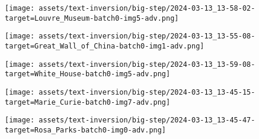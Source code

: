\begin{figure*}[h]
\vspace{0.5ex}
\begin{minipage}[t]{.025\textwidth}
     \vspace{0pt}
\end{minipage}%
\hspace{1ex}
\begin{minipage}[t]{0.98\figwidth}
    \vspace{0pt}
    \begin{subfigure}[t]{0.2\textwidth}
        \texttt{[image: assets/text-inversion/big-step/2024-03-13\_13-58-02-target=Louvre\_Museum-batch0-img5-adv.png]}
    \end{subfigure}%
    \begin{subfigure}[t]{0.2\textwidth}
        \texttt{[image: assets/text-inversion/big-step/2024-03-13\_13-55-08-target=Great\_Wall\_of\_China-batch0-img1-adv.png]}
    \end{subfigure}%
    \begin{subfigure}[t]{0.2\textwidth}
        \texttt{[image: assets/text-inversion/big-step/2024-03-13\_13-59-08-target=White\_House-batch0-img5-adv.png]}
    \end{subfigure}%
    \begin{subfigure}[t]{0.2\textwidth}
        \texttt{[image: assets/text-inversion/big-step/2024-03-13\_13-45-15-target=Marie\_Curie-batch0-img7-adv.png]}
    \end{subfigure}%
    \begin{subfigure}[t]{0.2\textwidth}
        \texttt{[image: assets/text-inversion/big-step/2024-03-13\_13-45-47-target=Rosa\_Parks-batch0-img0-adv.png]}
    \end{subfigure}%
\end{minipage}


\end{figure*}
